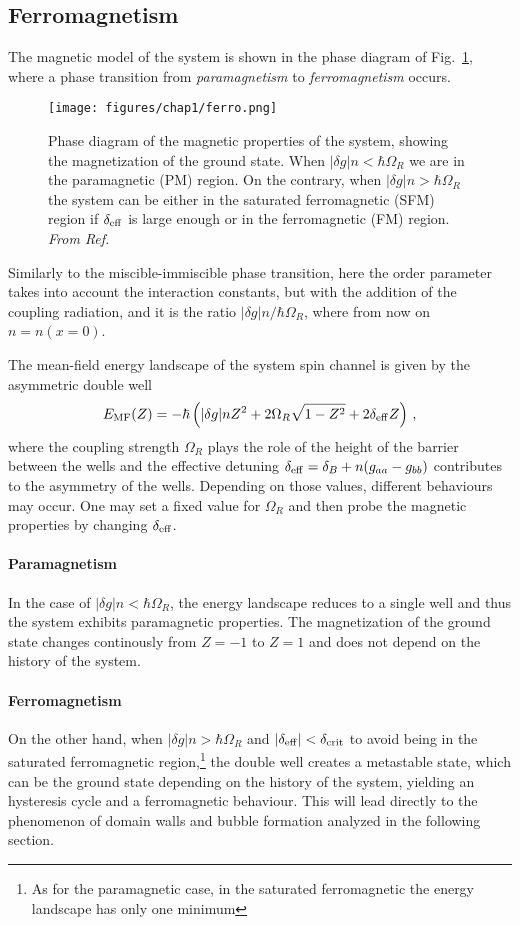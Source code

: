 \subsection{Ferromagnetism}
The magnetic model of the system is shown in the phase diagram of Fig.\ \ref{fig:ferro}, where a phase transition from \textit{paramagnetism} to \textit{ferromagnetism} occurs.
\begin{figure}[ht!]
    \centering
    \texttt{[image: figures/chap1/ferro.png]}
    \caption{Phase diagram of the magnetic properties of the system, showing the magnetization of the ground state. When $|\delta g|n < \hbar\Omega_R$ we are in the paramagnetic (PM) region. On the contrary, when $|\delta g|n > \hbar\Omega_R$ the system can be either in the saturated ferromagnetic (SFM) region if $\delta_{\rm eff}$ is large enough or in the ferromagnetic (FM) region. \textit{From Ref. \cite{cominotti2023ferro}}}
    \label{fig:ferro}
\end{figure}
Similarly to the miscible-immiscible phase transition, here the order parameter takes into account the interaction constants, but with the addition of the coupling radiation, and it is the ratio $|\delta g|n/\hbar\Omega_R$, where from now on $n = n(x = 0)$.

The mean-field energy landscape of the system spin channel is given by the asymmetric double well
\begin{equation}
    E_{\rm MF}(Z) = -\hbar\left(|\delta g|n Z^2 + 2\Omega_R \sqrt{1-Z^2} + 2\delta_{\rm eff} Z\right)\, ,
    \label{eq:E_MF}
\end{equation}
where the coupling strength $\Omega_R$ plays the role of the height of the barrier between the wells and the effective detuning $\delta_{\rm eff} = \delta_B + n(g_{aa}-g_{bb})$ contributes to the asymmetry of the wells. Depending on those values, different behaviours may occur. One may set a fixed value for $\Omega_R$ and then probe the magnetic properties by changing $\delta_{\rm eff}$.

\paragraph{Paramagnetism}
In the case of $|\delta g|n < \hbar\Omega_R$, the energy landscape reduces to a single well and thus the system exhibits paramagnetic properties. The magnetization of the ground state changes continously from $Z=-1$ to $Z=1$ and does not depend on the history of the system. 

\paragraph{Ferromagnetism}
On the other hand, when $|\delta g|n > \hbar\Omega_R$ and $|\delta_{\rm eff}| < \delta_{\rm crit}$ to avoid being in the saturated ferromagnetic region,\footnote{As for the paramagnetic case, in the saturated ferromagnetic the energy landscape has only one minimum} the double well creates a metastable state, which can be the ground state depending on the history of the system, yielding an hysteresis cycle and a ferromagnetic behaviour. This will lead directly to the phenomenon of domain walls and bubble formation analyzed in the following section.


